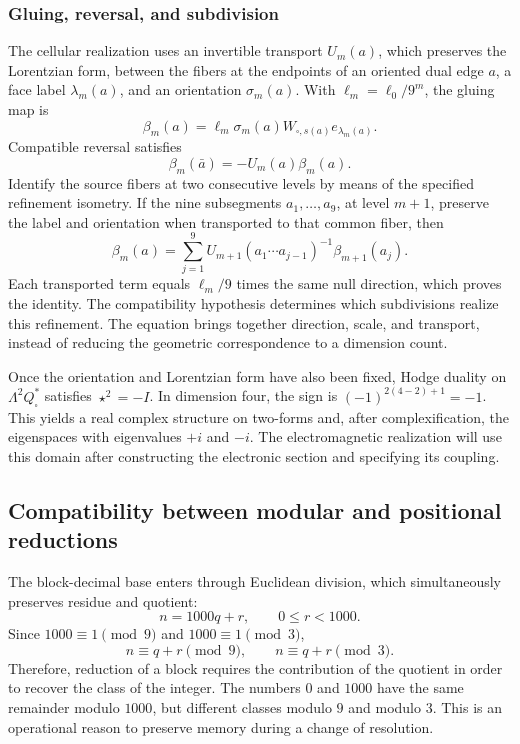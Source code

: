 \subsubsection{Gluing, reversal, and subdivision}

The cellular realization uses an invertible transport \(U_m(a)\),
which preserves the Lorentzian form, between the fibers at the endpoints of
an oriented dual edge \(a\), a face label
\(\lambda_m(a)\), and an orientation \(\sigma_m(a)\).
With \(\ell_m=\ell_0/9^m\), the gluing map is
\[
 \beta_m(a)=\ell_m\sigma_m(a)
 W_{\square,s(a)}e_{\lambda_m(a)}.
\]
Compatible reversal satisfies
\[
 \beta_m(\bar a)=-U_m(a)\beta_m(a).
\]
Identify the source fibers at two consecutive levels by means of
the specified refinement isometry. If the nine subsegments
\(a_1,\ldots,a_9\), at level \(m+1\), preserve the label
and orientation when transported to that common fiber, then
\begin{equation}
 \beta_m(a)=\sum_{j=1}^9
 U_{m+1}(a_1\cdots a_{j-1})^{-1}\beta_{m+1}(a_j).
 \label{eq:soldadura-refinamiento}
\end{equation}
Each transported term equals \(\ell_m/9\) times the same
null direction, which proves the identity. The compatibility hypothesis
determines which subdivisions realize this refinement.
The equation brings together direction, scale, and transport, instead of reducing
the geometric correspondence to a dimension count.

Once the orientation and Lorentzian form have also been fixed, Hodge duality
on \(\Lambda^2Q_\square^*\) satisfies \(\star^2=-I\).
In dimension four, the sign is \((-1)^{2(4-2)+1}=-1\).
This yields a real complex structure on two-forms and, after
complexification, the eigenspaces with eigenvalues \(+i\) and
\(-i\). The electromagnetic realization will use this domain
after constructing the electronic section and specifying its coupling.

\subsection{Compatibility between modular and positional reductions}

The block-decimal base enters through Euclidean division,
which simultaneously preserves residue and quotient:
\[
 n=1000q+r,\qquad 0\le r<1000.
\]
Since \(1000\equiv1\pmod9\) and \(1000\equiv1\pmod3\),
\[
 n\equiv q+r\pmod9,\qquad n\equiv q+r\pmod3.
\]
Therefore, reduction of a block requires the contribution of the
quotient in order to recover the class of the integer. The numbers \(0\) and
\(1000\) have the same remainder modulo \(1000\), but different classes
modulo \(9\) and modulo \(3\). This is an operational reason to preserve
memory during a change of resolution.

